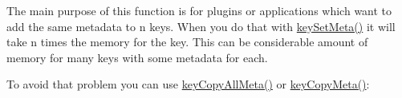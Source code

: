 \begin{DoxyCodeInclude}{0}
\DoxyCodeLine{\{}
\DoxyCodeLine{        \textcolor{comment}{// receive copy}}
\DoxyCodeLine{        \textcolor{comment}{// the caller will see the changed key k}}
\DoxyCodeLine{        \textcolor{comment}{// with all the metadata from copy}}
\DoxyCodeLine{\}}
\end{DoxyCodeInclude}
 The main purpose of this function is for plugins or applications which want to add the same metadata to n keys. When you do that with \mbox{\hyperlink{group__keymeta_gae1f15546b234ffb6007d8a31178652b9}{key\+Set\+Meta()}} it will take n times the memory for the key. This can be considerable amount of memory for many keys with some metadata for each.

To avoid that problem you can use \mbox{\hyperlink{group__keymeta_ga8e63720a65610a29597494d0671f9401}{key\+Copy\+All\+Meta()}} or \mbox{\hyperlink{group__keymeta_ga9a22b992478e613c8788bd460b4a1f0c}{key\+Copy\+Meta()}}\+:



